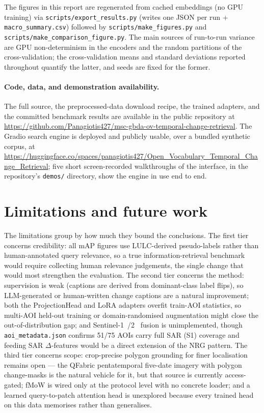 \documentclass{article}
\begin{document}
The figures in this report are regenerated from cached embeddings (no GPU
training) via \texttt{scripts/\allowbreak{}export\_\allowbreak{}results.py} (writes one JSON per run +
\texttt{macro\_\allowbreak{}summary.csv}) followed by \texttt{scripts/\allowbreak{}make\_\allowbreak{}figures.py} and
\texttt{scripts/\allowbreak{}make\_\allowbreak{}comparison\_\allowbreak{}figure.py}. The main sources of run-to-run
variance are GPU non-determinism in the encoders and the random partitions of the
cross-validation; the cross-validation means and standard deviations reported
throughout quantify the latter, and seeds are fixed for the former.

\paragraph{Code, data, and demonstration availability.}
The full source, the preprocessed-data download recipe, the trained adapters, and
the committed benchmark results are available in the public repository at
\url{https://github.com/Panagiotis427/msc-gbda-ov-temporal-change-retrieval}. The
Gradio search engine is deployed and publicly usable, over a bundled synthetic
corpus, at
\url{https://huggingface.co/spaces/panagiotis427/Open_Vocabulary_Temporal_Change_Retrieval};
five short screen-recorded walkthroughs of the interface, in the repository's
\texttt{demos/} directory, show the engine in use end to end.


\section{Limitations and future work}
\label{sec:future}

The limitations group by how much they bound the conclusions. The first tier
concerns credibility: all mAP figures use LULC-derived pseudo-labels rather than
human-annotated query relevance, so a true information-retrieval benchmark would
require collecting human relevance judgements, the single change that would most
strengthen the evaluation. The second tier concerns the method: supervision is
weak (captions are derived from dominant-class label flips), so LLM-generated or
human-written change captions are a natural improvement; both the ProjectionHead
and LoRA adapters overfit train-AOI statistics, so multi-AOI held-out training or
domain-randomised augmentation might close the out-of-distribution gap; and
Sentinel-1~\cite{sentinel1}/2~\cite{sentinel2} fusion is unimplemented, though
\texttt{aoi\_metadata.json} confirms 51/75 AOIs carry full SAR (S1) coverage and
feeding SAR $\Delta$-features would be a direct extension of the NRG pattern. The
third tier concerns scope: crop-precise polygon grounding for finer localisation
remains open --- the QFabric pentatemporal five-date imagery with polygon
change-masks is the natural vehicle for it, but that source is currently
access-gated; fMoW is wired only at the protocol level with no concrete loader;
and a learned query-to-patch attention head is unexplored because every trained
head on this data memorises rather than generalises.
\end{document}
